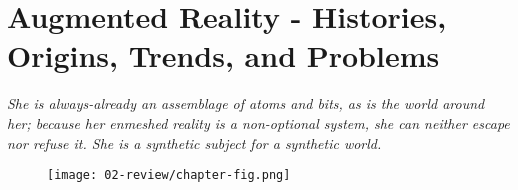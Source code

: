\chapter{Augmented Reality - Histories, Origins, Trends, and Problems}
\label{sec: review}
\epigraph{\emph{She is always-already an assemblage of atoms and bits, as is the world around her; because her enmeshed reality is a non-optional system, she can neither escape nor refuse it. She is a synthetic subject for a synthetic world.}}{\citep{boesel2013}}

\begin{figure}
    \centering
    \texttt{[image: 02-review/chapter-fig.png]}
    \captionsetup{labelformat=empty}
    \caption[\autoref*{sec: review}'s page-figure: We AR in MoMA (from \citeauthor{veenhof2010}, \citeyear{veenhof2010}), Microsoft Hololens 2 in use by the U.S. Army (from \citeauthor{microsoft2021}, \citeyear{microsoft2021}), Project North Star (own photograph)]{}
\end{figure}

\clearpage
